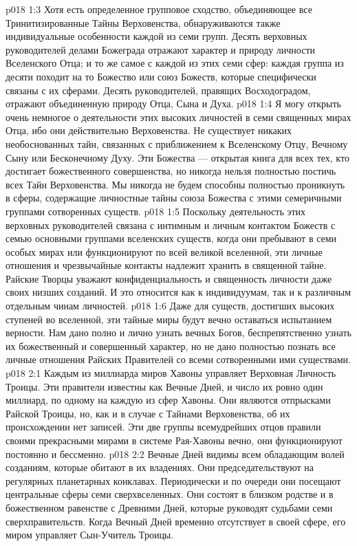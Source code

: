 \vs p018 1:3 Хотя есть определенное групповое сходство, объединяющее все Тринитизированные Тайны Верховенства, обнаруживаются также индивидуальные особенности каждой из семи групп. Десять верховных руководителей делами Божеграда отражают характер и природу личности Вселенского Отца; и то же самое с каждой из этих семи сфер: каждая группа из десяти походит на то Божество или союз Божеств, которые специфически связаны с их сферами. Десять руководителей, правящих Восходоградом, отражают объединенную природу Отца, Сына и Духа.
\vs p018 1:4 \pc Я могу открыть очень немногое о деятельности этих высоких личностей в семи священных мирах Отца, ибо они действительно  Верховенства. Не существует никаких необоснованных тайн, связанных с приближением к Вселенскому Отцу, Вечному Сыну или Бесконечному Духу. Эти Божества --- открытая книга для всех тех, кто достигает божественного совершенства, но никогда нельзя полностью постичь всех Тайн Верховенства. Мы никогда не будем способны полностью проникнуть в сферы, содержащие личностные тайны союза Божества с этими семеричными группами сотворенных существ.
\vs p018 1:5 Поскольку деятельность этих верховных руководителей связана с интимным и личным контактом Божеств с семью основными группами вселенских существ, когда они пребывают в семи особых мирах или функционируют по всей великой вселенной, эти личные отношения и чрезвычайные контакты надлежит хранить в священной тайне. Райские Творцы уважают конфиденциальность и священность личности даже своих низших созданий. И это относится как к индивидуумам, так и к различным отдельным чинам личностей.
\vs p018 1:6 Даже для существ, достигших высоких ступеней во вселенной, эти тайные миры будут вечно оставаться испытанием верности. Нам дано полно и лично узнать вечных Богов, беспрепятственно узнать их божественный и совершенный характер, но не дано полностью познать все личные отношения Райских Правителей со всеми сотворенными ими существами.
\vs p018 2:1 Каждым из миллиарда миров Хавоны управляет Верховная Личность Троицы. Эти правители известны как Вечные Дней, и число их ровно один миллиард, по одному на каждую из сфер Хавоны. Они являются отпрысками Райской Троицы, но, как и в случае с Тайнами Верховенства, об их происхождении нет записей. Эти две группы всемудрейших отцов правили своими прекрасными мирами в системе Рая\hyp{}Хавоны вечно, они функционируют постоянно и бессменно.
\vs p018 2:2 Вечные Дней видимы всем обладающим волей созданиям, которые обитают в их владениях. Они председательствуют на регулярных планетарных конклавах. Периодически и по очереди они посещают центральные сферы семи сверхвселенных. Они состоят в близком родстве и в божественном равенстве с Древними Дней, которые руководят судьбами семи сверхправительств. Когда Вечный Дней временно отсутствует в своей сфере, его миром управляет Сын\hyp{}Учитель Троицы.
